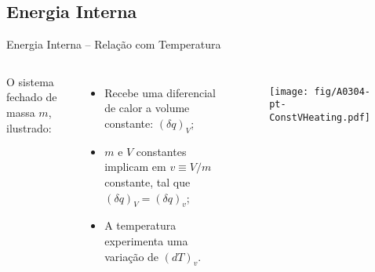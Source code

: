 \subsection{Energia Interna}

    \begin{frame}{Energia Interna -- Relação com Temperatura}\vspace*{-2em}
        \begin{columns}
            O sistema fechado de massa \alert{$m$}, ilustrado:\\[\smallskipamount]
            \begin{itemize}
                \item<1-> Recebe uma diferencial de calor a  volume  constante:  \alert{$(\delta
                    q)_V$};
                \item<2-> \alert{$m$} e \alert{$V$}  constantes  implicam  em  \alert{$v  \equiv
                    V/m$} constante, tal que \alert{$(\delta q)_V = (\delta q)_v$};
                \item<3-> A temperatura experimenta uma variação de \alert{$(dT)_v$}.
            \end{itemize}
            \begin{figure}
                \texttt{[image: fig/A0304-pt-ConstVHeating.pdf]}
            \end{figure}
        \end{columns}
    \end{frame}

